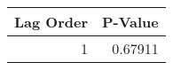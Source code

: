 \begin{tabular}{rr}
\toprule
 Lag Order &  P-Value \\
\midrule
         1 &  0.67911 \\
\bottomrule
\end{tabular}
